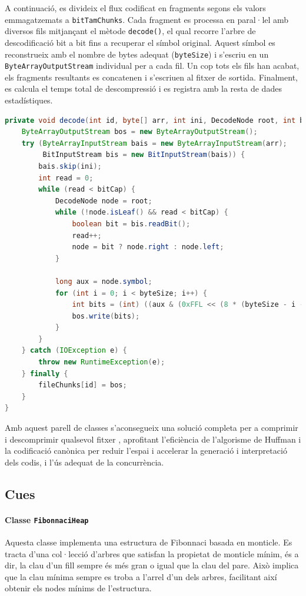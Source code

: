 \documentclass{ieeetj}
\begin{document}
A continuació, es divideix el flux codificat en fragments segons els valors emmagatzemats a \texttt{bitTamChunks}. Cada fragment es processa en paral·lel amb diversos fils mitjançant el mètode \texttt{decode()}, el qual recorre l’arbre de descodificació bit a bit fins a recuperar el símbol original. Aquest símbol es reconstrueix amb el nombre de bytes adequat (\texttt{byteSize}) i s'escriu en un \texttt{ByteArrayOutputStream} individual per a cada fil. Un cop tots els fils han acabat, els fragments resultants es concatenen i s'escriuen al fitxer de sortida. Finalment, es calcula el temps total de descompressió i es registra amb la resta de dades estadístiques. \newline

\begin{lstlisting}[language= Java, breaklines = true]
private void decode(int id, byte[] arr, int ini, DecodeNode root, int bitCap, int byteSize) {
    ByteArrayOutputStream bos = new ByteArrayOutputStream();
    try (ByteArrayInputStream bais = new ByteArrayInputStream(arr);
         BitInputStream bis = new BitInputStream(bais)) {
        bais.skip(ini);
        int read = 0;
        while (read < bitCap) {
            DecodeNode node = root;
            while (!node.isLeaf() && read < bitCap) {
                boolean bit = bis.readBit();
                read++;
                node = bit ? node.right : node.left;
            }

            long aux = node.symbol;
            for (int i = 0; i < byteSize; i++) {
                int bits = (int) ((aux & (0xFFL << (8 * (byteSize - i - 1)))) >> (8 * (byteSize - i - 1)));
                bos.write(bits);
            }
        }
    } catch (IOException e) {
        throw new RuntimeException(e);
    } finally {
        fileChunks[id] = bos;
    }
}    
\end{lstlisting}

Amb aquest parell de classes s’aconsegueix una solució completa per a comprimir i descomprimir qualsevol fitxer , aprofitant l’eficiència de l’algorisme de Huffman i la codificació canònica per reduir l’espai i accelerar la generació i interpretació dels codis, i l'ús adequat de la concurrència.

\subsection{Cues}

\paragraph{Classe \texttt{FibonnaciHeap}}  
Aquesta classe implementa una estructura de Fibonnaci basada en monticle. Es tracta d'una col·lecció d'arbres que satisfan la propietat de monticle mínim, és a dir, la clau d'un fill sempre és més gran o igual que la clau del pare. Això implica que la clau mínima sempre es troba a l'arrel d'un dels arbres, facilitant així obtenir els nodes mínims de l'estructura.\newline
\end{document}
